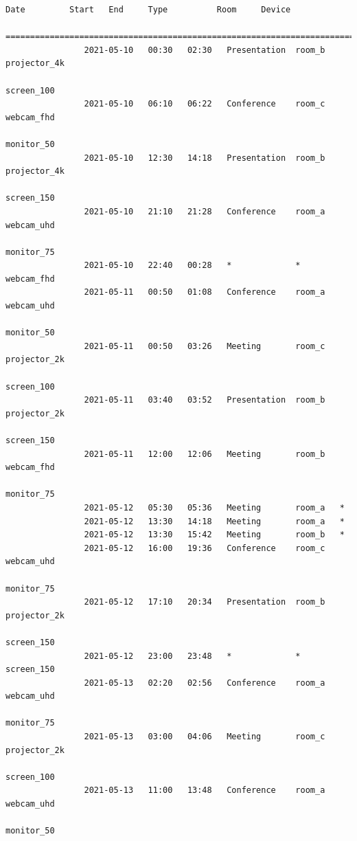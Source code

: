 \documentclass{article}
\begin{document}
\begin{Verbatim}[gobble=8]
                Date         Start   End     Type          Room     Device
                ===========================================================================
                2021-05-10   00:30   02:30   Presentation  room_b   projector_4k
                                                                    screen_100
                2021-05-10   06:10   06:22   Conference    room_c   webcam_fhd
                                                                    monitor_50
                2021-05-10   12:30   14:18   Presentation  room_b   projector_4k
                                                                    screen_150
                2021-05-10   21:10   21:28   Conference    room_a   webcam_uhd
                                                                    monitor_75
                2021-05-10   22:40   00:28   *             *        webcam_fhd
                2021-05-11   00:50   01:08   Conference    room_a   webcam_uhd
                                                                    monitor_50
                2021-05-11   00:50   03:26   Meeting       room_c   projector_2k
                                                                    screen_100
                2021-05-11   03:40   03:52   Presentation  room_b   projector_2k
                                                                    screen_150
                2021-05-11   12:00   12:06   Meeting       room_b   webcam_fhd
                                                                    monitor_75
                2021-05-12   05:30   05:36   Meeting       room_a   *
                2021-05-12   13:30   14:18   Meeting       room_a   *
                2021-05-12   13:30   15:42   Meeting       room_b   *
                2021-05-12   16:00   19:36   Conference    room_c   webcam_uhd
                                                                    monitor_75
                2021-05-12   17:10   20:34   Presentation  room_b   projector_2k
                                                                    screen_150
                2021-05-12   23:00   23:48   *             *        screen_150
                2021-05-13   02:20   02:56   Conference    room_a   webcam_uhd
                                                                    monitor_75
                2021-05-13   03:00   04:06   Meeting       room_c   projector_2k
                                                                    screen_100
                2021-05-13   11:00   13:48   Conference    room_a   webcam_uhd
                                                                    monitor_50

\end{Verbatim}
\end{document}
